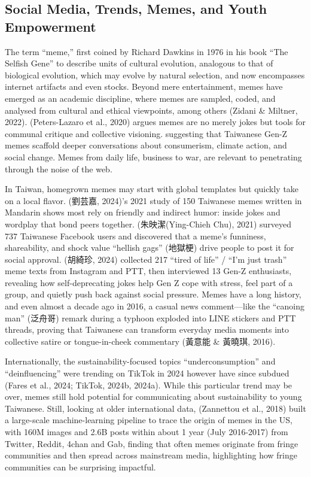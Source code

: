 \documentclass[
  12pt,
  letterpaper,
  DIV=11,
  numbers=noendperiod]{scrartcl}
\begin{document}
\let\pandoctableshortcapt\relax

\subsection{Social Media, Trends, Memes, and Youth
Empowerment}\label{social-media-trends-memes-and-youth-empowerment}

The term ``meme,'' first coined by Richard Dawkins in 1976 in his book
``The Selfish Gene'' to describe units of cultural evolution, analogous
to that of biological evolution, which may evolve by natural selection,
and now encompasses internet artifacts and even stocks. Beyond mere
entertainment, memes have emerged as an academic discipline, where memes
are sampled, coded, and analysed from cultural and ethical viewpoints,
among others (Zidani \& Miltner, 2022). (Peters-Lazaro et al., 2020)
argues memes are no merely jokes but tools for communal critique and
collective visioning. suggesting that Taiwanese Gen-Z memes scaffold
deeper conversations about consumerism, climate action, and social
change. Memes from daily life, business to war, are relevant to
penetrating through the noise of the web.

In Taiwan, homegrown memes may start with global templates but quickly
take on a local flavor. (劉芸嘉, 2024)'s 2021 study of 150 Taiwanese
memes written in Mandarin shows most rely on friendly and indirect
humor: inside jokes and wordplay that bond peers together.
(朱映潔(Ying-Chieh Chu), 2021) surveyed 737 Taiwanese Facebook users and
discovered that a meme's funniness, shareability, and shock value
``hellish gags'' (地獄梗) drive people to post it for social approval.
(胡綺珍, 2024) collected 217 ``tired of life'' / ``I'm just trash'' meme
texts from Instagram and PTT, then interviewed 13 Gen-Z enthusiasts,
revealing how self-deprecating jokes help Gen Z cope with stress, feel
part of a group, and quietly push back against social pressure. Memes
have a long history, and even almost a decade ago in 2016, a casual news
comment---like the ``canoing man'' (泛舟哥) remark during a typhoon
exploded into LINE stickers and PTT threads, proving that Taiwanese can
transform everyday media moments into collective satire or
tongue-in-cheek commentary (黃意能 \& 黃曉琪, 2016).

Internationally, the sustainability-focused topics ``underconsumption''
and ``deinfluencing'' were trending on TikTok in 2024 however have since
subdued (Fares et al., 2024; TikTok, 2024b, 2024a). While this
particular trend may be over, memes still hold potential for
communicating about sustainability to young Taiwanese. Still, looking at
older international data, (Zannettou et al., 2018) built a large-scale
machine-learning pipeline to trace the origin of memes in the US, with
160M images and 2.6B posts within about 1 year (July 2016-2017) from
Twitter, Reddit, 4chan and Gab, finding that often memes originate from
fringe communities and then spread across mainstream media, highlighting
how fringe communities can be surprising impactful.
\end{document}
